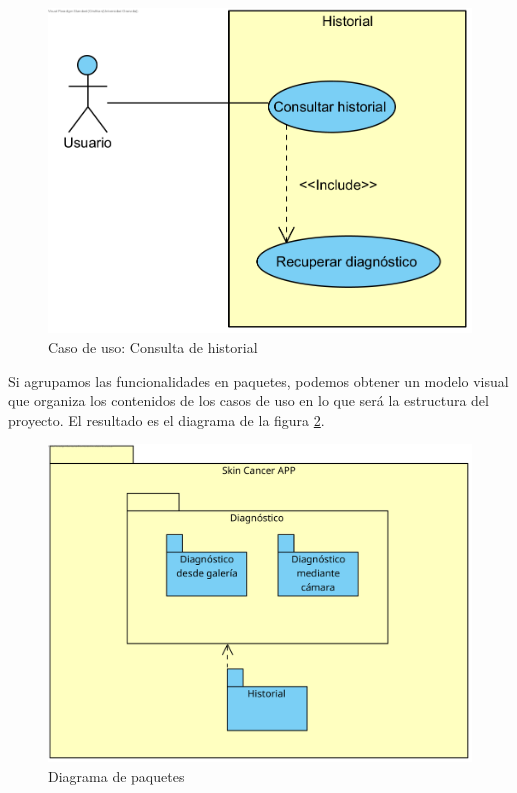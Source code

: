  
  \begin{figure}[H]
 	\centering
 	\includegraphics[scale = 1]{imagenes/Historial.png}
 	\caption{Caso de uso: Consulta de historial}
 	\label{fig:histcu}
 \end{figure}

Si agrupamos las funcionalidades en paquetes, podemos obtener un modelo visual que organiza los contenidos de los casos de uso en lo que  será la estructura del proyecto. El resultado es el diagrama de la figura \ref{fig:paquetes}.

\begin{figure}[H]
	\centering
	\includegraphics[scale = 0.7]{imagenes/DiagramaPaquetes.png}
	\caption{Diagrama de paquetes}
	\label{fig:paquetes}
\end{figure}

